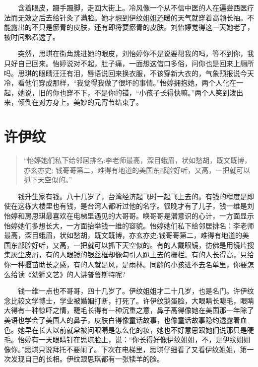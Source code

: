 \documentclass[12pt,UTF8]{ctexbook}
\begin{document}
　　含着眼皮，蹑手蹑脚，走回大街上。冷风像一个从不信中医的人在遍尝西医疗法而无效之后去给针灸了满脸。她才想到伊纹姐姐还暖的天气就穿着高领长袖。不能露出的不只是瘀青的皮肤，还有即将要瘀青的皮肤。刘怡婷觉得这一天她老了，被时间熬煮透了。

　　突然，思琪在街角跳进她的眼皮，刘怡婷你不是说要帮我的吗，等不到你，我只好自己回来。怡婷说对不起，肚子痛，一面想这借口多俗，问你也是回来上厕所吗。思琪的眼睛汪汪有泪，唇语说回来换衣服，不该穿新大衣的，气象预报说今天冷，看他们穿成那样，\enquote{我觉得我做了很坏的事情。}怡婷拥抱她，两个人化在一起，她说，旧的你也穿不下，不是你的错，\enquote{小孩子长得快嘛。}两个人笑到泼出来，倾倒在对方身上。美妙的元宵节结束了。

\hypertarget{ux8bb8ux4f0aux7eb9}{%
\section*{许伊纹}\label{ux8bb8ux4f0aux7eb9}}

\begin{quote}
\enquote{怡婷她们私下给邻居排名:李老师最高，深目蛾眉，状如愁胡，既文既博，亦玄亦史; 钱哥哥第二，难得有地道的美国东部腔好听，又高，一把就可以抓下天空似的。}
\end{quote}

　　钱升生家有钱。八十几岁了，台湾经济起飞时一起飞上去的。有钱的程度是即使在这栋大楼里也有钱，是台湾人都听过他的名字。很晚才有了儿子，钱一维是刘怡婷和房思琪最喜欢在电梯里遇见的大哥哥。唤哥哥是潜意识的心计，一方面显示怡婷她们多想长大，一方面抬举钱一维的容貌。怡婷她们私下给邻居排名：李老师最高，深目蛾眉，状如愁胡，既文既博，亦玄亦史;钱哥哥第二，难得有地道的美国东部腔好听，又高，一把就可以抓下天空似的。有的人戴眼镜，彷佛是用镜片搜集灰尘皮屑，有的人眼镜的银丝框却像勾引人趴上去的栅栏。有的人长得高，只给你一种揠苗助长之感，有的人就是风，是雨林。同龄的小孩进不去名单里，你要怎么给读《幼狮文艺》的人讲普鲁斯特呢?

　　钱一维一点也不哥哥，四十几岁了。伊纹姐姐才二十几岁，也是名门。许伊纹念比较文学博士，学业被婚姻打断，打死了。许伊纹鹅蛋脸，大眼睛长睫毛，眼睛大得有一种惊吓之情，睫毛长得有一种沉重之意，鼻子高得像她在美国那一年除了美语也学会了美国人的鼻子，皮肤白得像童话故事，也像童话故事隐约透露着血色。她早在长大以前就常被问眼睛是怎么化的妆，她也不好意思跟她们说那只是睫毛。怡婷有一天眼睛钉在思琪脸上，说：\enquote{你长得好像伊纹姐姐，不，是伊纹姐姐像你。}思琪只说拜托不要闹了。下次在电梯里，思琪仔细看了又看伊纹姐姐，第一次发现自己的长相。伊纹跟思琪都有一张犊羊的脸。
\end{document}
